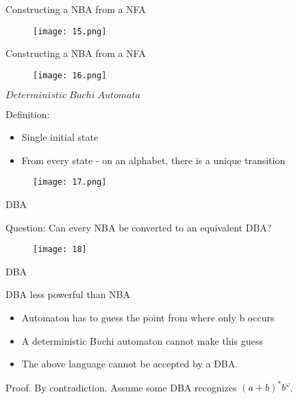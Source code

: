 \documentclass[17pt, t, lualatex]{beamer}
\begin{document}
\begin{frame}{Constructing a NBA from a NFA}
    \begin{figure}
        \centering
        \texttt{[image: 15.png]}
    \end{figure}
\end{frame}

\begin{frame}{Constructing a NBA from a NFA}
    \begin{figure}
        \centering
        \texttt{[image: 16.png]}
    \end{figure}
\end{frame}

\begin{frame}{$Deterministic\; B\ddot{u}chi\; Automata$}
\begin{block}{Definition:}
    \begin{itemize}
        \item Single initial state
        \item From every state - on an alphabet, there is a unique transition
    \end{itemize}
    \begin{figure}
        \centering
        \texttt{[image: 17.png]}
    \end{figure}
\end{block}
\end{frame}

\begin{frame}{DBA}
\begin{block}{Question: Can every NBA be converted to an equivalent
DBA?}
\begin{figure}
    \centering
    \texttt{[image: 18]}
\end{figure}
\end{block}
\end{frame}

\begin{frame}{DBA}
\begin{block}{DBA less powerful than NBA}
    \begin{itemize}
        \item Automaton has to guess the point from where only b occurs
        \item A deterministic B$\ddot{u}$chi automaton cannot make this guess
        \item The above language cannot be accepted by a DBA.
    \end{itemize}
    \begin{block}{Proof.}
         By contradiction. Assume some DBA recognizes $(a+b)^*b^{\omega}$.
    \end{block}
\end{block}   
\end{frame}
\end{document}
